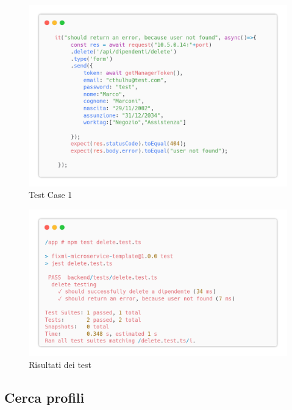 \documentclass{report}
\begin{document}
\begin{figure}[H]
	\centering\includegraphics[width=1\textwidth]{images/microservizio-dipendenti/tests/delete_test_2.png}
	\caption{Test Case 1}
\end{figure}
\begin{figure}[H]
	\centering\includegraphics[width=1\textwidth]{images/microservizio-dipendenti/tests/delete_test_results.png}
	\caption{Risultati dei test}
\end{figure}
\subsection*{Cerca profili}
\end{document}
